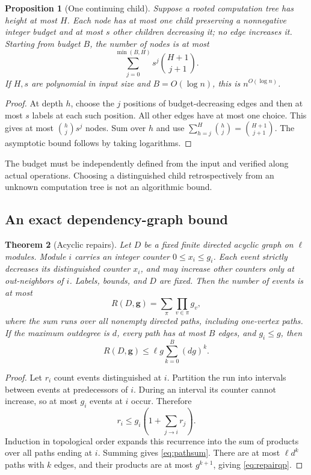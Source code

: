 \documentclass[11pt]{article}
\newtheorem{theorem}{Theorem}[section]
\newtheorem{proposition}[theorem]{Proposition}
\theoremstyle{definition}
\theoremstyle{remark}
\begin{document}
\begin{proposition}[One continuing child]
\label{prop:tree}
Suppose a rooted computation tree has height at most $H$. Each node has at most one child preserving a nonnegative integer budget and at most $s$ other children decreasing it; no edge increases it. Starting from budget $B$, the number of nodes is at most
\begin{equation}
 \sum_{j=0}^{\min(B,H)}s^j\binom{H+1}{j+1}.
 \label{eq:tree}
\end{equation}
If $H,s$ are polynomial in input size and $B=O(\log n)$, this is $n^{O(\log n)}$.
\end{proposition}
\begin{proof}
At depth $h$, choose the $j$ positions of budget-decreasing edges and then at most $s$ labels at each such position. All other edges have at most one choice. This gives at most $\binom hj s^j$ nodes. Sum over $h$ and use $\sum_{h=j}^H\binom hj=\binom{H+1}{j+1}$. The asymptotic bound follows by taking logarithms.
\end{proof}
The budget must be independently defined from the input and verified along actual operations. Choosing a distinguished child retrospectively from an unknown computation tree is not an algorithmic bound.

\subsection{An exact dependency-graph bound}
\begin{theorem}[Acyclic repairs]
\label{thm:repairs}
Let $D$ be a fixed finite directed acyclic graph on $\ell$ modules. Module $i$ carries an integer counter $0\le x_i\le g_i$. Each event strictly decreases its distinguished counter $x_i$, and may increase other counters only at out-neighbors of $i$. Labels, bounds, and $D$ are fixed. Then the number of events is at most
\begin{equation}
 R(D,\mathbf g)=\sum_{\pi}\prod_{v\in\pi}g_v,
 \label{eq:pathsum}
\end{equation}
where the sum runs over all nonempty directed paths, including one-vertex paths. If the maximum outdegree is $d$, every path has at most $B$ edges, and $g_i\le g$, then
\begin{equation}
 R(D,\mathbf g)\le \ell g\sum_{k=0}^B(dg)^k.
 \label{eq:repairqp}
\end{equation}
\end{theorem}
\begin{proof}
Let $r_i$ count events distinguished at $i$. Partition the run into intervals between events at predecessors of $i$. During an interval its counter cannot increase, so at most $g_i$ events at $i$ occur. Therefore
\[
 r_i\le g_i\left(1+\sum_{j\to i}r_j\right).
\]
Induction in topological order expands this recurrence into the sum of products over all paths ending at $i$. Summing gives \eqref{eq:pathsum}. There are at most $\ell d^k$ paths with $k$ edges, and their products are at most $g^{k+1}$, giving \eqref{eq:repairqp}.
\end{proof}
\end{document}
